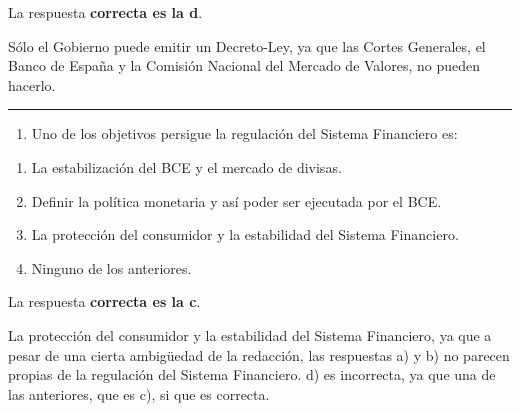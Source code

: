 \documentclass[
  letterpaper,
  DIV=11,
  numbers=noendperiod]{scrreprt}
\providecommand{\tightlist}{%
  \setlength{\itemsep}{0pt}\setlength{\parskip}{0pt}}\usepackage{longtable,booktabs,array}
\begin{document}
\begin{tcolorbox}[enhanced jigsaw, left=2mm, opacityback=0, colback=white, breakable, arc=.35mm, bottomrule=.15mm, rightrule=.15mm, toprule=.15mm, leftrule=.75mm, colframe=quarto-callout-tip-color-frame]
\begin{minipage}[t]{5.5mm}
\textcolor{quarto-callout-tip-color}{\faLightbulb}
\end{minipage}%
\begin{minipage}[t]{\textwidth - 5.5mm}

La respuesta \textbf{correcta es la d}.

Sólo el Gobierno puede emitir un Decreto-Ley, ya que las Cortes
Generales, el Banco de España y la Comisión Nacional del Mercado de
Valores, no pueden hacerlo.

\end{minipage}%
\end{tcolorbox}

\begin{center}\rule{0.5\linewidth}{0.5pt}\end{center}

\begin{enumerate}
\def\labelenumi{\arabic{enumi}.}
\setcounter{enumi}{28}
\tightlist
\item
  Uno de los objetivos persigue la regulación del Sistema Financiero es:
\end{enumerate}

\begin{enumerate}
\def\labelenumi{\alph{enumi})}
\item
  La estabilización del BCE y el mercado de divisas.
\item
  Definir la política monetaria y así poder ser ejecutada por el BCE.
\item
  La protección del consumidor y la estabilidad del Sistema Financiero.
\item
  Ninguno de los anteriores.
\end{enumerate}

\begin{tcolorbox}[enhanced jigsaw, left=2mm, opacityback=0, colback=white, breakable, arc=.35mm, bottomrule=.15mm, rightrule=.15mm, toprule=.15mm, leftrule=.75mm, colframe=quarto-callout-tip-color-frame]
\begin{minipage}[t]{5.5mm}
\textcolor{quarto-callout-tip-color}{\faLightbulb}
\end{minipage}%
\begin{minipage}[t]{\textwidth - 5.5mm}

La respuesta \textbf{correcta es la c}.

La protección del consumidor y la estabilidad del Sistema Financiero, ya
que a pesar de una cierta ambigüedad de la redacción, las respuestas a)
y b) no parecen propias de la regulación del Sistema Financiero. d) es
incorrecta, ya que una de las anteriores, que es c), si que es correcta.

\end{minipage}%
\end{tcolorbox}
\end{document}
